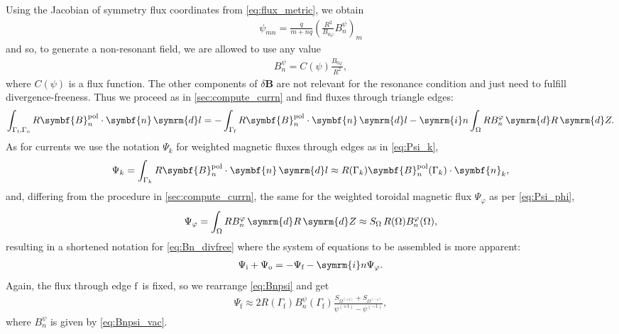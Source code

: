 \documentclass[a4paper, twoside, 10pt, english]{article}
\numberwithin{equation}{section}
\let\temp\varrho
\let\varrho\rho
\let\rho\temp
\let\temp\vartheta
\let\vartheta\theta
\let\theta\temp
\let\temp\varphi
\let\varphi\phi
\let\phi\temp
\let\vec\symbf
\newcommand*\diff{\ensuremath{\symrm{d}}}  %
\newcommand*\im{\ensuremath{\symrm{i}}}  %
\newcommand*\pol{\ensuremath{\textrm{pol}}}  %
\newcommand*\Bpert{\ensuremath{\delta \vec{B}}}  %
\newcommand*\fs{\ensuremath{\textrm{f}}}  %
\newcommand*\inw{\ensuremath{\textrm{i}}}  %
\newcommand*\out{\ensuremath{\textrm{o}}}  %
\begin{document}
Using the Jacobian of symmetry flux coordinates from \cref{eq:flux_metric}, we obtain
\begin{gather}
  \psi_{m n} = \frac{q}{m + n q} \left( \frac{R^{2}}{B_{0 \phi}} B_{n}^{\psi} \right)_{m}
\end{gather}
and so, to generate a non-resonant field, we are allowed to use any value
\begin{gather}
  B_{n}^{\psi} = C(\psi) \frac{B_{0 \phi}}{R^{2}}, \label{eq:Bnpsi_vac}
\end{gather}
where $C(\psi)$ is a flux function. The other components of $\Bpert$ are not relevant for the resonance condition and just need to fulfill divergence-freeness. Thus we proceed as in \cref{sec:compute_currn} and find fluxes through triangle edges:
\begin{gather}
  \int_{\Gamma_{\inw}, \Gamma_{\out}} R \vec{B}_{n}^{\pol} \cdot \vec{n} \, \diff l = -\int_{\Gamma_{\fs}} R \vec{B}_{n}^{\pol} \cdot \vec{n} \, \diff l - \im n \int_{\Omega} R B_{n}^{\phi} \, \diff R \, \diff Z. \label{eq:Bn_divfree}
\end{gather}
As for currents we use the notation $\Psi_{k}$ for weighted magnetic fluxes through edges as in \cref{eq:Psi_k},
\begin{gather}
  \Psi_{k} = \int_{\Gamma_{k}} R \vec{B}_{n}^{\pol} \cdot \vec{n} \, \diff l \approx R (\Gamma_{k}) \vec{B}_{n}^{\pol} (\Gamma_{k}) \cdot \vec{n}_{k},
\end{gather}
and, differing from the procedure in \cref{sec:compute_currn}, the same for the weighted toroidal magnetic flux $\Psi_{\phi}$ as per \cref{eq:Psi_phi},
\begin{gather}
  \Psi_{\phi} = \int_{\Omega} R B_{n}^{\phi} \, \diff R \, \diff Z \approx S_{\Omega} \, R (\Omega) B_{n}^{\phi} (\Omega),
\end{gather}
resulting in a shortened notation for \cref{eq:Bn_divfree} where the system of equations to be assembled is more apparent:
\begin{gather}
  \Psi_{\inw} + \Psi_{\out} = -\Psi_{\fs} - \im n \Psi_{\phi}.
\end{gather}
Again, the flux through edge \fs\ is fixed, so we rearrange \cref{eq:Bnpsi} and get
\begin{gather}
  \Psi_{\fs} \approx 2 R (\Gamma_{\fs}) B_{n}^{\psi} (\Gamma_{\fs}) \frac{S_{\Omega^{(+1)}} + S_{\Omega^{(-1)}}}{\psi^{(+1)} - \psi^{(-1)}}, \label{eq:Psi_f}
\end{gather}
where $B_{n}^{\psi}$ is given by \cref{eq:Bnpsi_vac}.
\end{document}

